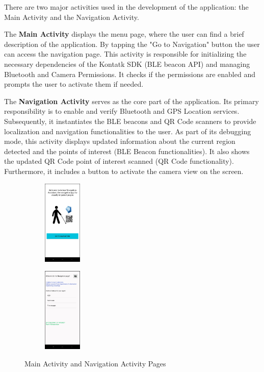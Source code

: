 There are two major activities used in the development of the application: the Main Activity and the Navigation Activity.

The \textbf{Main Activity} displays the menu page, where the user can find a brief description of the application. By tapping the "Go to Navigation" button the user can access the navigation page. This activity is responsible for initializing the necessary dependencies of the Kontatk SDK (BLE beacon API) and managing Bluetooth and Camera Permissions. It checks if the permissions are enabled and prompts the user to activate them if needed.

The \textbf{Navigation Activity} serves as the core part of the application. Its primary responsibility is to enable and verify Bluetooth and GPS Location services.
Subsequently, it instantiates the BLE beacons and QR Code scanners to provide localization and navigation functionalities to the user. As part of its debugging mode, this activity displays updated information about the current region detected and the points of interest (BLE Beacon functionalities). It also shows the updated QR Code point of interest scanned (QR Code functionality). Furthermore, it includes a button to activate the camera view on the screen.

\vfill\null
\columnbreak

\begin{figure}[H]
    \centering
    \begin{subfigure}
        \centering
        \includegraphics[width=0.2\textwidth]{chapters/architecture/images/main_activity.jpg}
        \label{fig:my_label}
    \end{subfigure}
    \hfill
    \begin{subfigure}
        \centering
        \includegraphics[width=0.2\textwidth]{chapters/architecture/images/navigation_activity.jpg}
    \end{subfigure}
    \caption{Main Activity and Navigation Activity Pages}
\end{figure}
